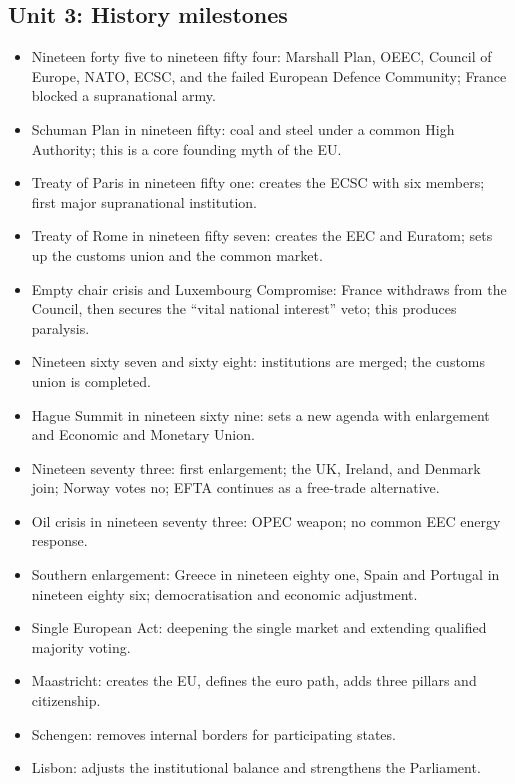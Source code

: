 \documentclass[10pt,a4paper]{article}
\begin{document}
\subsection*{Unit 3: History milestones}
\begin{itemize}
\item Nineteen forty five to nineteen fifty four: Marshall Plan, OEEC, Council of Europe, NATO, ECSC, and the failed European Defence Community; France blocked a supranational army.
\item Schuman Plan in nineteen fifty: coal and steel under a common High Authority; this is a core founding myth of the EU.
\item Treaty of Paris in nineteen fifty one: creates the ECSC with six members; first major supranational institution.
\item Treaty of Rome in nineteen fifty seven: creates the EEC and Euratom; sets up the customs union and the common market.
\item Empty chair crisis and Luxembourg Compromise: France withdraws from the Council, then secures the “vital national interest” veto; this produces paralysis.
\item Nineteen sixty seven and sixty eight: institutions are merged; the customs union is completed.
\item Hague Summit in nineteen sixty nine: sets a new agenda with enlargement and Economic and Monetary Union.
\item Nineteen seventy three: first enlargement; the UK, Ireland, and Denmark join; Norway votes no; EFTA continues as a free-trade alternative.
\item Oil crisis in nineteen seventy three: OPEC weapon; no common EEC energy response.
\item Southern enlargement: Greece in nineteen eighty one, Spain and Portugal in nineteen eighty six; democratisation and economic adjustment.
\item Single European Act: deepening the single market and extending qualified majority voting.
\item Maastricht: creates the EU, defines the euro path, adds three pillars and citizenship.
\item Schengen: removes internal borders for participating states.
\item Lisbon: adjusts the institutional balance and strengthens the Parliament.
\end{itemize}
\end{document}
